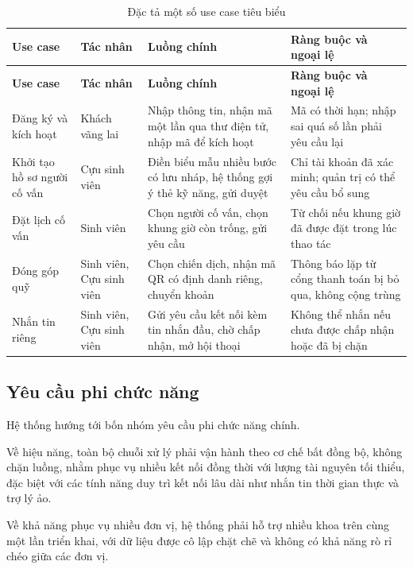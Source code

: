 \documentclass[12pt,a4paper,oneside]{report}
\begin{document}
\renewcommand{\arraystretch}{1.2}
\begin{longtable}{|>{\raggedright\arraybackslash}p{3.0cm}|>{\raggedright\arraybackslash}p{2.4cm}|>{\raggedright\arraybackslash}p{4.4cm}|>{\raggedright\arraybackslash}p{4.6cm}|}
\caption{Đặc tả một số use case tiêu biểu}\label{tab:usecasespec}\\
\hline \textbf{Use case} & \textbf{Tác nhân} & \textbf{Luồng chính} & \textbf{Ràng buộc và ngoại lệ} \\ \hline
\endfirsthead
\hline \textbf{Use case} & \textbf{Tác nhân} & \textbf{Luồng chính} & \textbf{Ràng buộc và ngoại lệ} \\ \hline
\endhead
Đăng ký và kích hoạt & Khách vãng lai & Nhập thông tin, nhận mã một lần qua thư điện tử, nhập mã để kích hoạt & Mã có thời hạn; nhập sai quá số lần phải yêu cầu lại \\ \hline
Khởi tạo hồ sơ người cố vấn & Cựu sinh viên & Điền biểu mẫu nhiều bước có lưu nháp, hệ thống gợi ý thẻ kỹ năng, gửi duyệt & Chỉ tài khoản đã xác minh; quản trị có thể yêu cầu bổ sung \\ \hline
Đặt lịch cố vấn & Sinh viên & Chọn người cố vấn, chọn khung giờ còn trống, gửi yêu cầu & Từ chối nếu khung giờ đã được đặt trong lúc thao tác \\ \hline
Đóng góp quỹ & Sinh viên, Cựu sinh viên & Chọn chiến dịch, nhận mã QR có định danh riêng, chuyển khoản & Thông báo lặp từ cổng thanh toán bị bỏ qua, không cộng trùng \\ \hline
Nhắn tin riêng & Sinh viên, Cựu sinh viên & Gửi yêu cầu kết nối kèm tin nhắn đầu, chờ chấp nhận, mở hội thoại & Không thể nhắn nếu chưa được chấp nhận hoặc đã bị chặn \\ \hline
\end{longtable}
\renewcommand{\arraystretch}{1}

\subsection{Yêu cầu phi chức năng}

Hệ thống hướng tới bốn nhóm yêu cầu phi chức năng chính.

Về hiệu năng, toàn bộ chuỗi xử lý phải vận hành theo cơ chế bất đồng bộ, không chặn luồng, nhằm phục vụ nhiều kết nối đồng thời với lượng tài nguyên tối thiểu, đặc biệt với các tính năng duy trì kết nối lâu dài như nhắn tin thời gian thực và trợ lý ảo.

Về khả năng phục vụ nhiều đơn vị, hệ thống phải hỗ trợ nhiều khoa trên cùng một lần triển khai, với dữ liệu được cô lập chặt chẽ và không có khả năng rò rỉ chéo giữa các đơn vị.
\end{document}
